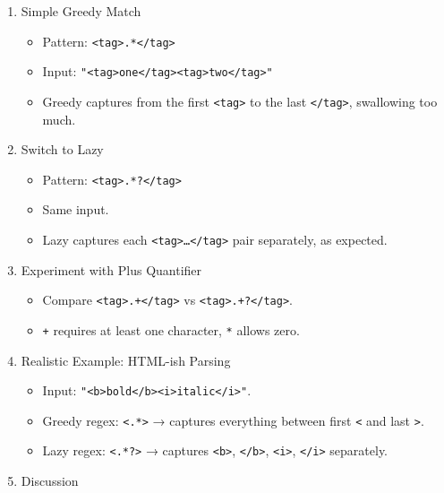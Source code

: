 \documentclass[
  letterpaper,
  DIV=11,
  numbers=noendperiod]{scrreprt}
\providecommand{\tightlist}{%
  \setlength{\itemsep}{0pt}\setlength{\parskip}{0pt}}
\begin{document}
\begin{enumerate}
\def\labelenumi{\arabic{enumi}.}
\item
  Simple Greedy Match

  \begin{itemize}
  \tightlist
  \item
    Pattern:
    \texttt{\textless{}tag\textgreater{}.*\textless{}/tag\textgreater{}}
  \item
    Input:
    \texttt{"\textless{}tag\textgreater{}one\textless{}/tag\textgreater{}\textless{}tag\textgreater{}two\textless{}/tag\textgreater{}"}
  \item
    Greedy captures from the first \texttt{\textless{}tag\textgreater{}}
    to the last \texttt{\textless{}/tag\textgreater{}}, swallowing too
    much.
  \end{itemize}
\item
  Switch to Lazy

  \begin{itemize}
  \tightlist
  \item
    Pattern:
    \texttt{\textless{}tag\textgreater{}.*?\textless{}/tag\textgreater{}}
  \item
    Same input.
  \item
    Lazy captures each
    \texttt{\textless{}tag\textgreater{}…\textless{}/tag\textgreater{}}
    pair separately, as expected.
  \end{itemize}
\item
  Experiment with Plus Quantifier

  \begin{itemize}
  \tightlist
  \item
    Compare
    \texttt{\textless{}tag\textgreater{}.+\textless{}/tag\textgreater{}}
    vs
    \texttt{\textless{}tag\textgreater{}.+?\textless{}/tag\textgreater{}}.
  \item
    \texttt{+} requires at least one character, \texttt{*} allows zero.
  \end{itemize}
\item
  Realistic Example: HTML-ish Parsing

  \begin{itemize}
  \tightlist
  \item
    Input:
    \texttt{"\textless{}b\textgreater{}bold\textless{}/b\textgreater{}\textless{}i\textgreater{}italic\textless{}/i\textgreater{}"}.
  \item
    Greedy regex: \texttt{\textless{}.*\textgreater{}} → captures
    everything between first \texttt{\textless{}} and last
    \texttt{\textgreater{}}.
  \item
    Lazy regex: \texttt{\textless{}.*?\textgreater{}} → captures
    \texttt{\textless{}b\textgreater{}},
    \texttt{\textless{}/b\textgreater{}},
    \texttt{\textless{}i\textgreater{}},
    \texttt{\textless{}/i\textgreater{}} separately.
  \end{itemize}
\item
  Discussion


\end{enumerate}
\end{document}
